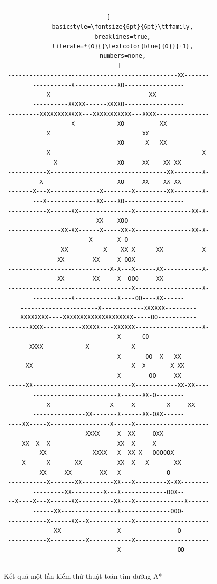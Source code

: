 \documentclass[12pt,a4paper]{article}
\begin{document}
\begin{figure}[H]
\begin{tabular}{c}
\begin{lstlisting}[
        basicstyle=\fontsize{6pt}{6pt}\ttfamily,
        breaklines=true,
        literate=*{O}{{\textcolor{blue}{O}}}{1},
        numbers=none,
      ]
------------------------------------------------XX------------------X------------XO-----------------
-----------X----------------------------XX-------------------------XXXXX------XXXXO-----------------
---------XXXXXXXXXXXX---XXXXXXXXXXX---XXXX--------------------------X------------XO----------XX-----
-----------X--------------------------XX-----------------------------------------XO------X---XX-----
-----------X-------------------------------------------X-------X-----------------XO-----XX----XX-XX-
-----------X---------------------------------XX--------X---X---------------------XO-----XX----XX-XX-
-------X---X--------------X--------X---------XX--------X----X--------------XX----XO-----------------
-----------X------XX---------------X----------------XX-X-------------------XX----XOO----------------
---------------XX-XX------X-----XX-X----------------XX-X-----------------X-------X-O----------------
---------------XX----------X----XX-X------XX-----------X--------XX--------XX-----X-OOX--------------
-----------------------------X-X---X------XX-----------X--------XX--------XX-----X--OOO-----XX------
-----------------------------------X-------------------X------------X------------X----OO----XX------
----------------------X------------XXXXXX---------XXXXXXXX----XXXXXXXXXXXXXXXXXXXX-----OO-----------
------XXXX-----------XXXXX----XXXXXX-------------------X-------------------------X------OO----------
------XXXX------------X------------X---------------------------------------------X-------OO--X---XX-
-----XX----------------------------X--X-------X-XX-------------------------------X--------OO-----XX-
-----XX----------------------------X------------XX-XX----------------------------X------XX-O--------
-----------X-----------------X-----X---------X-----XX-------------------XX-------X------XX-OXX------
----XX-----X-----------------X-----X------------------------------------XXXX-----X--XX-----OXX------
----XX--X--X-------------------XX--X-----X-----------------XX-------------XXXX---X--XX-X---OOOOOX---
----X------X-------XX----------XX--X---X-------XX----------XX-----XX--------XX---X-------------O----
-----------X-------XX---------XX---X---------X-XX-----------------XX---------X---X-------------OOX--
--X----X---X------XX----------XX---X--------------X------------XX----------------X--------------OOO-
-----------X------XX--X------------X---------------------------XX----------------X----------------O-
-----------X----------X------------X---------------------------------------------X----------------OO
      \end{lstlisting}
    \end{tabular}
    \caption{Kết quả một lần kiểm thử thuật toán tìm đường A*}
    \label{test_find_path_a*}
  \end{figure}
\end{document}
